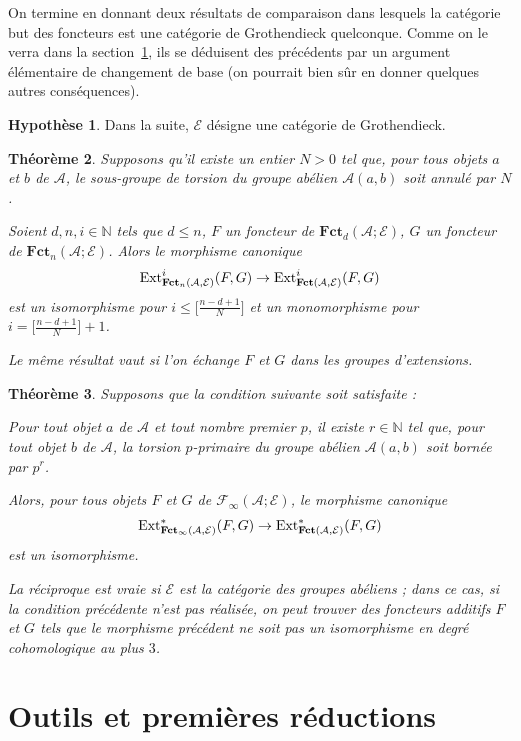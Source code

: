 \documentclass[a4paper,10pt]{article}
\newcommand{\A}{{\mathcal{A}}}
\newcommand{\F}{{\mathcal{F}}}
\newcommand{\fct}{\mathbf{Fct}}
\newcommand{\E}{{\mathcal{E}}}
\newcommand{\Pol}{\fct}
\newtheorem{thm}{Th\'eor\`eme}[section]
\theoremstyle{definition}
\newtheorem{hyp}[thm]{Hypoth\`ese}
\theoremstyle{remark}
\begin{document}
On termine en donnant deux résultats de comparaison dans lesquels la catégorie but des foncteurs est une catégorie de Grothendieck quelconque. Comme on le verra dans la section~\ref{so}, ils se déduisent des précédents par un argument élémentaire de changement de base (on pourrait bien sûr en donner quelques autres conséquences).

\begin{hyp}
 Dans la suite, $\E$ désigne une catégorie de Grothendieck.
\end{hyp}


\begin{thm}\label{th-db}
 Supposons qu'il existe un entier $N>0$ tel que, pour tous objets $a$ et $b$ de $\A$, le sous-groupe de torsion du groupe abélien $\A(a,b)$ soit annulé par $N$.

Soient $d,n,i\in\mathbb{N}$ tels que $d\leq n$, $F$ un foncteur de $\Pol_d(\A;\E)$, $G$ un foncteur de $\Pol_n(\A;\E)$. Alors le morphisme canonique
$${\rm Ext}^i_{\Pol_n(\A,\E)}(F,G)\to {\rm Ext}^i_{\fct(\A,\E)}(F,G)$$
est un isomorphisme pour $i\leq \big[\frac{n-d+1}{N}\big]$ et un monomorphisme pour $i=\big[\frac{n-d+1}{N}\big]+1$.

Le même résultat vaut si l'on échange $F$ et $G$ dans les groupes d'extensions.
\end{thm}

\begin{thm}\label{th-anag} Supposons que la condition suivante soit satisfaite :
 
 Pour tout objet $a$ de $\A$ et tout nombre premier $p$, il existe $r\in\mathbb{N}$ tel que, pour tout objet $b$ de $\A$, la torsion $p$-primaire du groupe abélien $\A(a,b)$ soit bornée par $p^r$.

Alors, pour tous objets $F$ et $G$ de $\F_\infty(\A;\E)$, le morphisme canonique
$${\rm Ext}^*_{\Pol_\infty(\A,\E)}(F,G)\to {\rm Ext}^*_{\fct(\A,\E)}(F,G)$$
est un isomorphisme.

La réciproque est vraie si $\E$ est la catégorie des groupes abéliens ; dans ce cas, si la condition précédente n'est pas réalisée, on peut trouver des foncteurs additifs $F$ et $G$ tels que le morphisme précédent ne soit pas un isomorphisme en degré cohomologique au plus $3$.
\end{thm}


\section{Outils et premières réductions}\label{so}
\end{document}
